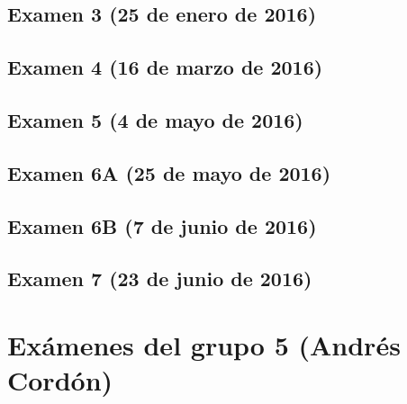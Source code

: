 \documentclass[a4paper,12pt,twoside]{book}
\begin{document}
\subsection{Examen 3 (25 de enero de 2016)}
 \label{examen_15_16_4_3}
\subsection{Examen 4 (16 de marzo de 2016)}
\subsection{Examen 5 (4 de mayo de 2016)}
\subsection{Examen 6A (25 de mayo de 2016)}
\subsection{Examen 6B (7 de junio de 2016)} 
 \label{examen_15_16_4_6}
\subsection{Examen 7 (23 de junio de 2016)}
  \label{examen_15_16_4_7}

\section{Exámenes del grupo 5 (Andrés Cordón)}


\appendix %






\nocite{Alonso-12b}
\nocite{Bird-99a}
\nocite{Cunningham-10a}
\nocite{Daume-06}
\nocite{Davie-92a}
\nocite{Doets-04a}
\nocite{Fokker-96}
\nocite{Hudak-00a}
\nocite{Hudak-12a}
\nocite{Hutton-07a}
\nocite{OSullivan-08a}
\nocite{Rabhi-99a}
\nocite{Polya-65a}
\nocite{Ruiz-04}
\nocite{Thompson-11a}



\end{document}
